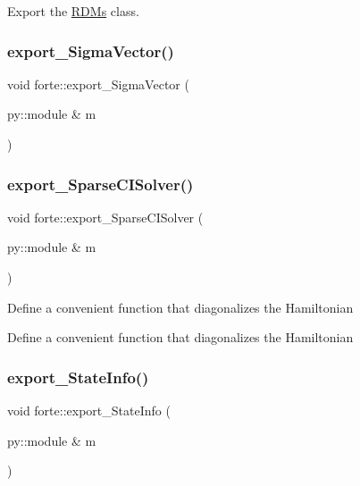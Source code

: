 Export the \mbox{\hyperlink{classforte_1_1_r_d_ms}{R\+D\+Ms}} class. 

\mbox{\label{namespaceforte_a9f2bc553016280d8fa1052f17e0b1080}} 
\subsubsection{\texorpdfstring{export\+\_\+\+Sigma\+Vector()}{export\_SigmaVector()}}
{\footnotesize\ttfamily void forte\+::export\+\_\+\+Sigma\+Vector (\begin{DoxyParamCaption}\item[{py\+::module \&}]{m }\end{DoxyParamCaption})}

\mbox{\label{namespaceforte_aab5ce189063e0b0204b02b4499119d74}} 
\subsubsection{\texorpdfstring{export\+\_\+\+Sparse\+C\+I\+Solver()}{export\_SparseCISolver()}}
{\footnotesize\ttfamily void forte\+::export\+\_\+\+Sparse\+C\+I\+Solver (\begin{DoxyParamCaption}\item[{py\+::module \&}]{m }\end{DoxyParamCaption})}

Define a convenient function that diagonalizes the Hamiltonian

Define a convenient function that diagonalizes the Hamiltonian \mbox{\label{namespaceforte_aa8c5682e4ff2b32f1fe2b3473f1a770b}} 
\subsubsection{\texorpdfstring{export\+\_\+\+State\+Info()}{export\_StateInfo()}}
{\footnotesize\ttfamily void forte\+::export\+\_\+\+State\+Info (\begin{DoxyParamCaption}\item[{py\+::module \&}]{m }\end{DoxyParamCaption})}



